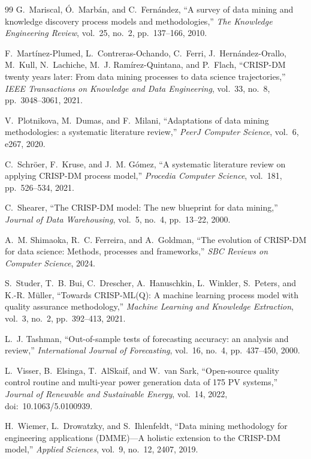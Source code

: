 \documentclass[11pt,a4paper]{article}
\begin{document}
\begin{thebibliography}{99}
G.~Mariscal, \'O.~Marb\'an, and C.~Fern\'andez,
``A survey of data mining and knowledge discovery process models and
methodologies,''
\emph{The Knowledge Engineering Review}, vol.~25, no.~2, pp.~137--166, 2010.

F.~Mart\'inez-Plumed, L.~Contreras-Ochando, C.~Ferri, J.~Hern\'andez-Orallo,
M.~Kull, N.~Lachiche, M.~J. Ram\'irez-Quintana, and P.~Flach,
``CRISP-DM twenty years later: From data mining processes to data science
trajectories,''
\emph{IEEE Transactions on Knowledge and Data Engineering}, vol.~33, no.~8,
pp.~3048--3061, 2021.

V.~Plotnikova, M.~Dumas, and F.~Milani,
``Adaptations of data mining methodologies: a systematic literature review,''
\emph{PeerJ Computer Science}, vol.~6, e267, 2020.

C.~Schr\"oer, F.~Kruse, and J.~M. G\'omez,
``A systematic literature review on applying CRISP-DM process model,''
\emph{Procedia Computer Science}, vol.~181, pp.~526--534, 2021.

C.~Shearer,
``The CRISP-DM model: The new blueprint for data mining,''
\emph{Journal of Data Warehousing}, vol.~5, no.~4, pp.~13--22, 2000.

A.~M. Shimaoka, R.~C. Ferreira, and A.~Goldman,
``The evolution of CRISP-DM for data science: Methods, processes and
frameworks,''
\emph{SBC Reviews on Computer Science}, 2024.

S.~Studer, T.~B. Bui, C.~Drescher, A.~Hanuschkin, L.~Winkler, S.~Peters, and
K.-R. M\"uller,
``Towards CRISP-ML(Q): A machine learning process model with quality assurance
methodology,''
\emph{Machine Learning and Knowledge Extraction}, vol.~3, no.~2, pp.~392--413,
2021.

L.~J. Tashman,
``Out-of-sample tests of forecasting accuracy: an analysis and review,''
\emph{International Journal of Forecasting}, vol.~16, no.~4, pp.~437--450,
2000.

L.~Visser, B.~Elsinga, T.~AlSkaif, and W.~van Sark,
``Open-source quality control routine and multi-year power generation data of
175 PV systems,''
\emph{Journal of Renewable and Sustainable Energy}, vol.~14, 2022,
doi:~10.1063/5.0100939.

H.~Wiemer, L.~Drowatzky, and S.~Ihlenfeldt,
``Data mining methodology for engineering applications (DMME)---A holistic
extension to the CRISP-DM model,''
\emph{Applied Sciences}, vol.~9, no.~12, 2407, 2019.


\end{thebibliography}
\end{document}

